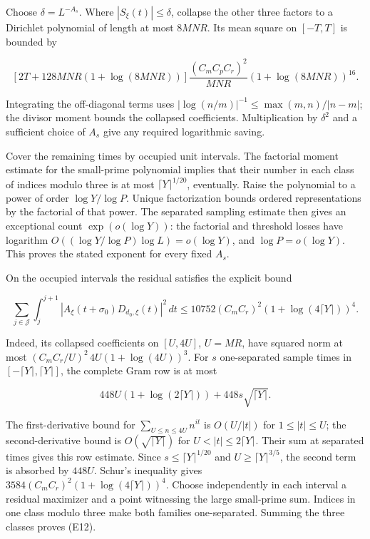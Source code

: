 Choose \(\delta=L^{-A_s}\). Where \(|S_\xi(t)|\le\delta\), collapse the
other three factors to a Dirichlet polynomial of length at most
\(8MNR\). Its mean square on \([-T,T]\) is bounded by

\[
[2T+128MNR(1+\log(8MNR))]
 \frac{(C_mC_pC_r)^2}{MNR}(1+\log(8MNR))^{16}.
\]

Integrating the off-diagonal terms uses
\(|\log(n/m)|^{-1}\le\max(m,n)/|n-m|\); the divisor moment bounds the
collapsed coefficients. Multiplication by \(\delta^2\) and a sufficient
choice of \(A_s\) give any required logarithmic saving.

Cover the remaining times by occupied unit intervals. The factorial
moment estimate for the small-prime polynomial implies that their number
in each class of indices modulo three is at most
\(\lceil Y\rceil^{1/20}\), eventually. Raise the polynomial to a power
of order \(\log Y/\log P\). Unique factorization bounds ordered
representations by the factorial of that power. The separated sampling
estimate then gives an exceptional count \(\exp(o(\log Y))\): the
factorial and threshold losses have logarithm
\(O((\log Y/\log P)\log L)=o(\log Y)\), and \(\log P=o(\log Y)\). This
proves the stated exponent for every fixed \(A_s\).

On the occupied intervals the residual satisfies the explicit bound

\[
\sum_{j\in\mathcal J}\int_j^{j+1}
 |A_\xi(t+\sigma_0)D_{d_0,\xi}(t)|^2\,dt
 \le10752(C_mC_r)^2(1+\log(4\lceil Y\rceil))^4.
\tag{E12}
\]

Indeed, its collapsed coefficients on \([U,4U]\), \(U=MR\), have squared
norm at most \((C_mC_r/U)^2\,4U(1+\log(4U))^3\). For \(s\) one-separated
sample times in \([-\lceil Y\rceil,\lceil Y\rceil]\), the complete Gram
row is at most

\[
448U(1+\log(2\lceil Y\rceil))+448s\sqrt{\lceil Y\rceil}.
\]

The first-derivative bound for \(\sum_{U\le n\le4U}n^{it}\) is
\(O(U/|t|)\) for \(1\le|t|\le U\); the second-derivative bound is
\(O(\sqrt{\lceil Y\rceil})\) for \(U<|t|\le2\lceil Y\rceil\). Their sum
at separated times gives this row estimate. Since
\(s\le\lceil Y\rceil^{1/20}\) and \(U\ge\lceil Y\rceil^{3/5}\), the
second term is absorbed by \(448U\). Schur's inequality gives
\(3584(C_mC_r)^2(1+\log(4\lceil Y\rceil))^4\). Choose independently in
each interval a residual maximizer and a point witnessing the large
small-prime sum. Indices in one class modulo three make both families
one-separated. Summing the three classes proves (E12).

